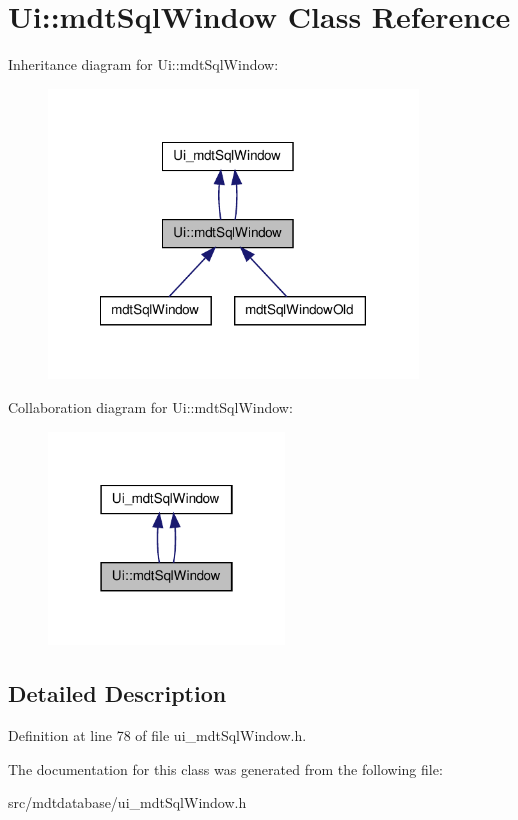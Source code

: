 \hypertarget{class_ui_1_1mdt_sql_window}{
\section{Ui::mdtSqlWindow Class Reference}
\label{class_ui_1_1mdt_sql_window}
}


Inheritance diagram for Ui::mdtSqlWindow:\nopagebreak
\begin{figure}[H]
\begin{center}
\leavevmode
\includegraphics[width=278pt]{class_ui_1_1mdt_sql_window__inherit__graph}
\end{center}
\end{figure}


Collaboration diagram for Ui::mdtSqlWindow:\nopagebreak
\begin{figure}[H]
\begin{center}
\leavevmode
\includegraphics[width=178pt]{class_ui_1_1mdt_sql_window__coll__graph}
\end{center}
\end{figure}


\subsection{Detailed Description}


Definition at line 78 of file ui\_\-mdtSqlWindow.h.



The documentation for this class was generated from the following file:\begin{DoxyCompactItemize}
\item 
src/mdtdatabase/ui\_\-mdtSqlWindow.h\end{DoxyCompactItemize}

